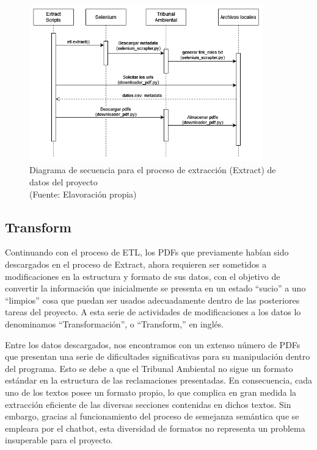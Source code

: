 \begin{figure}[ht!]
    \centering
    \includegraphics[width=0.9\textwidth]{figures/extract_diagram.png}
    \caption[Diagrama de secuencia para el proceso de extracción (Extract) de datos del proyecto]{Diagrama de secuencia para el proceso de extracción (Extract) de datos del proyecto\\
    {\scriptsize (Fuente: Elavoración propia)}}
    \label{fig:extract_diagram}
\end{figure}


\newpage

\subsection{Transform}

\par Continuando con el proceso de ETL, los PDFs que previamente habían sido descargados en el proceso de Extract,
ahora requieren ser sometidos a modificaciones en la estructura y formato de sus datos, con el objetivo de convertir la información que inicialmente se presenta en un 
estado ``sucio'' a uno  ``limpios'' cosa que puedan ser usados adecuadamente dentro de las posteriores tareas del proyecto. A esta serie de actividades de modificaciones a los datos lo denominamos
``Transformación'', o ``Transform,'' en inglés.

\par Entre los datos descargados, nos encontramos con un extenso número de PDFs que presentan una serie de dificultades significativas para su 
manipulación dentro del programa. Esto se debe a que el Tribunal Ambiental no sigue un formato estándar en la estructura de las reclamaciones 
presentadas. En consecuencia, cada uno de los textos posee un formato propio, lo que complica en gran medida la extracción 
eficiente de las diversas secciones contenidas en dichos textos. Sin embargo, gracias al funcionamiento del proceso de semejanza 
semántica que se empleara por el chatbot, esta diversidad de formatos no representa un problema insuperable para el proyecto.


